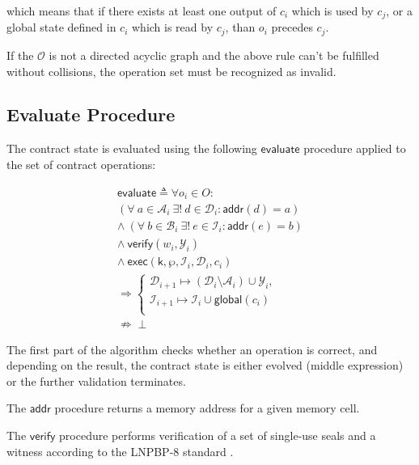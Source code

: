 \documentclass[a4paper]{article}
\begin{document}
\begin{multicols}{2}
which means that if there exists at least one output of $c_i$ which is used by $c_j$, or a global
state defined in $c_i$ which is read by $c_j$, than $o_i$ precedes $c_j$.

If the $\mathcal{O}$ is not a directed acyclic graph and the above rule can't be fulfilled without
collisions, the operation set must be recognized as invalid.


\subsection{Evaluate Procedure}\label{Evaluate}

The contract state is evaluated using the following $\mathsf{evaluate}$ procedure applied to the set of
contract operations:

\begin{equation}
\begin{split}
\mathsf{evaluate} \triangleq \forall o_i \in O: \\
(\forall \ a \in \mathcal{A}_i \ \exists! \ d \in \mathcal{D}_i: \mathsf{addr}(d) = a) \\
\wedge \ (\forall \ b \in \mathcal{B}_i \ \exists! \ e \in \mathcal{I}_i: \mathsf{addr}(e) = b) \\
\wedge \ \mathsf{verify}(w_i, \mathcal{Y}_i) \\
\wedge \ \mathsf{exec}(\mathsf{k}, \wp, \mathcal{I}_i, \mathcal{D}_i, c_i) \\
\Rightarrow 
\begin{cases}
    \mathcal{D}_{i+1} \mapsto (\mathcal{D}_i \setminus \mathcal{A}_i) \cup \mathcal{Y}_i, \\[6pt]
    \mathcal{I}_{i+1} \mapsto \mathcal{I}_i \cup \mathsf{global}(c_i) \\
\end{cases} \\
\nRightarrow \perp
\end{split}
\end{equation}

The first part of the algorithm checks whether an operation is correct, and depending on the result,
the contract state is either evolved (middle expression) or the further validation terminates.

The $\mathsf{addr}$ procedure returns a memory address for a given memory cell.

The $\mathsf{verify}$ procedure performs verification of a set of single-use seals and a witness
according to the LNPBP-8 standard \cite{LNPBP8}.


\end{multicols}
\end{document}

